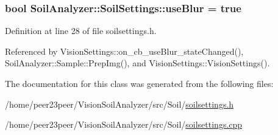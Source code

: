 \subsubsection[{use\+Blur}]{\setlength{\rightskip}{0pt plus 5cm}bool Soil\+Analyzer\+::\+Soil\+Settings\+::use\+Blur = true}\label{class_soil_analyzer_1_1_soil_settings_a21bd246a48a712734af86f592030e18b}


Definition at line 28 of file soilsettings.\+h.



Referenced by Vision\+Settings\+::on\+\_\+cb\+\_\+use\+Blur\+\_\+state\+Changed(), Soil\+Analyzer\+::\+Sample\+::\+Prep\+Img(), and Vision\+Settings\+::\+Vision\+Settings().



The documentation for this class was generated from the following files\+:\begin{DoxyCompactItemize}
\item 
/home/peer23peer/\+Vision\+Soil\+Analyzer/src/\+Soil/\hyperlink{soilsettings_8h}{soilsettings.\+h}\item 
/home/peer23peer/\+Vision\+Soil\+Analyzer/src/\+Soil/\hyperlink{soilsettings_8cpp}{soilsettings.\+cpp}\end{DoxyCompactItemize}

